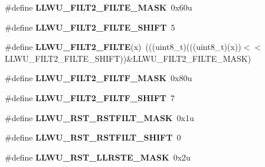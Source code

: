 \begin{DoxyCompactItemize}
\item 
\#define {\bfseries L\+L\+W\+U\+\_\+\+F\+I\+L\+T2\+\_\+\+F\+I\+L\+T\+E\+\_\+\+M\+A\+SK}~0x60u\hypertarget{group__LLWU__Register__Masks_ga6c6d4145e30bdb324bc6b137b2f7aada}{}\label{group__LLWU__Register__Masks_ga6c6d4145e30bdb324bc6b137b2f7aada}

\item 
\#define {\bfseries L\+L\+W\+U\+\_\+\+F\+I\+L\+T2\+\_\+\+F\+I\+L\+T\+E\+\_\+\+S\+H\+I\+FT}~5\hypertarget{group__LLWU__Register__Masks_gac309ec1ef795572d048b09ac35847bf1}{}\label{group__LLWU__Register__Masks_gac309ec1ef795572d048b09ac35847bf1}

\item 
\#define {\bfseries L\+L\+W\+U\+\_\+\+F\+I\+L\+T2\+\_\+\+F\+I\+L\+TE}(x)~(((uint8\+\_\+t)(((uint8\+\_\+t)(x))$<$$<$L\+L\+W\+U\+\_\+\+F\+I\+L\+T2\+\_\+\+F\+I\+L\+T\+E\+\_\+\+S\+H\+I\+FT))\&L\+L\+W\+U\+\_\+\+F\+I\+L\+T2\+\_\+\+F\+I\+L\+T\+E\+\_\+\+M\+A\+SK)\hypertarget{group__LLWU__Register__Masks_ga3c7ed2286e6f1a0041610a9b7de636ef}{}\label{group__LLWU__Register__Masks_ga3c7ed2286e6f1a0041610a9b7de636ef}

\item 
\#define {\bfseries L\+L\+W\+U\+\_\+\+F\+I\+L\+T2\+\_\+\+F\+I\+L\+T\+F\+\_\+\+M\+A\+SK}~0x80u\hypertarget{group__LLWU__Register__Masks_gab60be1393d84433fe44d4b332a77537c}{}\label{group__LLWU__Register__Masks_gab60be1393d84433fe44d4b332a77537c}

\item 
\#define {\bfseries L\+L\+W\+U\+\_\+\+F\+I\+L\+T2\+\_\+\+F\+I\+L\+T\+F\+\_\+\+S\+H\+I\+FT}~7\hypertarget{group__LLWU__Register__Masks_ga20b3ccaef11cade3a0dc88b3a378b790}{}\label{group__LLWU__Register__Masks_ga20b3ccaef11cade3a0dc88b3a378b790}

\item 
\#define {\bfseries L\+L\+W\+U\+\_\+\+R\+S\+T\+\_\+\+R\+S\+T\+F\+I\+L\+T\+\_\+\+M\+A\+SK}~0x1u\hypertarget{group__LLWU__Register__Masks_ga6a909bf1d49bb4f85ad988396fe928f2}{}\label{group__LLWU__Register__Masks_ga6a909bf1d49bb4f85ad988396fe928f2}

\item 
\#define {\bfseries L\+L\+W\+U\+\_\+\+R\+S\+T\+\_\+\+R\+S\+T\+F\+I\+L\+T\+\_\+\+S\+H\+I\+FT}~0\hypertarget{group__LLWU__Register__Masks_gaaa76fead204f735855760c2f071ac11f}{}\label{group__LLWU__Register__Masks_gaaa76fead204f735855760c2f071ac11f}

\item 
\#define {\bfseries L\+L\+W\+U\+\_\+\+R\+S\+T\+\_\+\+L\+L\+R\+S\+T\+E\+\_\+\+M\+A\+SK}~0x2u\hypertarget{group__LLWU__Register__Masks_ga9c57c7139b6659782c0a5e160b790c3e}{}\label{group__LLWU__Register__Masks_ga9c57c7139b6659782c0a5e160b790c3e}


\end{DoxyCompactItemize}
